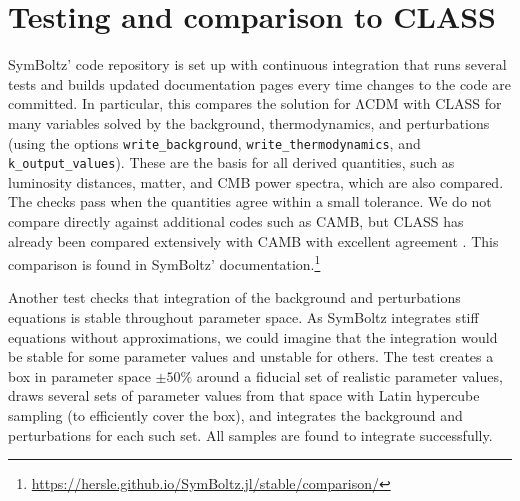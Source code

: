 \documentclass{aa}
\newcommand{\LCDM}{$\mathrm{\Lambda C D M}$}
\begin{document}
\section{Testing and comparison to CLASS}
\label{sec:testing}

SymBoltz' code repository is set up with continuous integration that runs several tests and builds updated documentation pages every time changes to the code are committed.
In particular, this compares the solution for \LCDM{} with CLASS for many variables solved by the background, thermodynamics, and perturbations (using the options \texttt{write\_background}, \texttt{write\_thermodynamics}, and \texttt{k\_output\_values}).
These are the basis for all derived quantities, such as luminosity distances, matter, and CMB power spectra, which are also compared.
The checks pass when the quantities agree within a small tolerance.
We do not compare directly against additional codes such as CAMB, but CLASS has already been compared extensively with CAMB with excellent agreement \citep{lesgourguesCosmicLinearAnisotropy2011c}.
This comparison is found in SymBoltz' documentation.\footnote{\url{https://hersle.github.io/SymBoltz.jl/stable/comparison/}}

Another test checks that integration of the background and perturbations equations is stable throughout parameter space.
As SymBoltz integrates stiff equations without approximations, we could imagine that the integration would be stable for some parameter values and unstable for others.
The test creates a box in parameter space $\pm 50\%$ around a fiducial set of realistic parameter values, draws several sets of parameter values from that space with Latin hypercube sampling (to efficiently cover the box), and integrates the background and perturbations for each such set.
All samples are found to integrate successfully.
\end{document}
